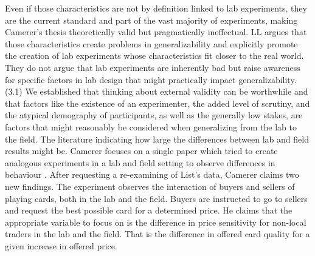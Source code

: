 \documentclass{article}
\begin{document}
Even if those characteristics are not by definition linked to lab experiments, they are the current standard and part of the vast majority of experiments, making Camerer’s thesis theoretically valid but pragmatically ineffectual. LL argues that those characteristics create problems in generalizability and explicitly promote the creation of lab experiments whose characteristics fit closer to the real world. They do not argue that lab experiments are inherently bad but raise awareness for specific factors in lab design that might practically impact generalizability. 
\\

(3.1) 	We established that thinking about external validity can be worthwhile and that factors like the existence of an experimenter, the added level of scrutiny, and the atypical demography of participants, as well as the generally low stakes, are factors that might reasonably be considered when generalizing from the lab to the field. The literature indicating how large the differences between lab and field results might be. Camerer focuses on a single paper which tried to create analogous experiments in a lab and field setting to observe differences in behaviour \citep{List.2006}. After requesting a re-examining of List's data, Camerer claims two new findings. 
The experiment observes the interaction of buyers and sellers of playing cards, both in the lab and the field. Buyers are instructed to go to sellers and request the best possible card for a determined price. He claims that the appropriate variable to focus on is the difference in price sensitivity for non-local traders in the lab and the field. That is the difference in offered card quality for a given increase in offered price. 
\end{document}
